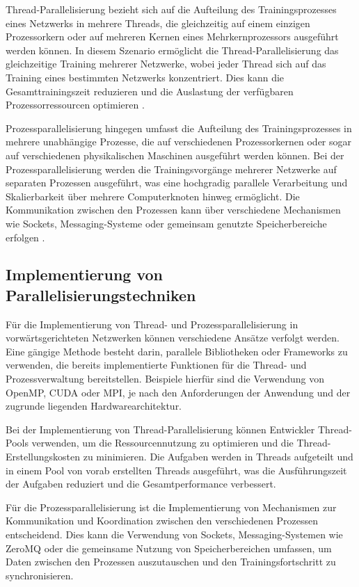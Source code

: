 Thread-Parallelisierung bezieht sich auf die Aufteilung des Trainingsprozesses eines Netzwerks in mehrere Threads, die gleichzeitig auf einem einzigen Prozessorkern oder auf mehreren Kernen eines Mehrkernprozessors ausgeführt werden können. In diesem Szenario ermöglicht die Thread-Parallelisierung das gleichzeitige Training mehrerer Netzwerke, wobei jeder Thread sich auf das Training eines bestimmten Netzwerks konzentriert. Dies kann die Gesamttrainingszeit reduzieren und die Auslastung der verfügbaren Prozessorressourcen optimieren \citep{Flynn_Computer_Organizations_and_their_Effectiveness}.

Prozessparallelisierung hingegen umfasst die Aufteilung des Trainingsprozesses in mehrere unabhängige Prozesse, die auf verschiedenen Prozessorkernen oder sogar auf verschiedenen physikalischen Maschinen ausgeführt werden können. Bei der Prozessparallelisierung werden die Trainingsvorgänge mehrerer Netzwerke auf separaten Prozessen ausgeführt, was eine hochgradig parallele Verarbeitung und Skalierbarkeit über mehrere Computerknoten hinweg ermöglicht. Die Kommunikation zwischen den Prozessen kann über verschiedene Mechanismen wie Sockets, Messaging-Systeme oder gemeinsam genutzte Speicherbereiche erfolgen \citep{Flynn_Computer_Organizations_and_their_Effectiveness}.

\subsection{Implementierung von Parallelisierungstechniken}
\label{sec:Grundlagen_Parallelisierung_Implementierung}
Für die Implementierung von Thread- und Prozessparallelisierung in vorwärtsgerichteten Netzwerken können verschiedene Ansätze verfolgt werden. Eine gängige Methode besteht darin, parallele Bibliotheken oder Frameworks zu verwenden, die bereits implementierte Funktionen für die Thread- und Prozessverwaltung bereitstellen. Beispiele hierfür sind die Verwendung von OpenMP, CUDA oder MPI, je nach den Anforderungen der Anwendung und der zugrunde liegenden Hardwarearchitektur.

Bei der Implementierung von Thread-Parallelisierung können Entwickler Thread-Pools verwenden, um die Ressourcennutzung zu optimieren und die Thread-Erstellungskosten zu minimieren. Die Aufgaben werden in Threads aufgeteilt und in einem Pool von vorab erstellten Threads ausgeführt, was die Ausführungszeit der Aufgaben reduziert und die Gesamtperformance verbessert.

Für die Prozessparallelisierung ist die Implementierung von Mechanismen zur Kommunikation und Koordination zwischen den verschiedenen Prozessen entscheidend. Dies kann die Verwendung von Sockets, Messaging-Systemen wie ZeroMQ oder die gemeinsame Nutzung von Speicherbereichen umfassen, um Daten zwischen den Prozessen auszutauschen und den Trainingsfortschritt zu synchronisieren.

